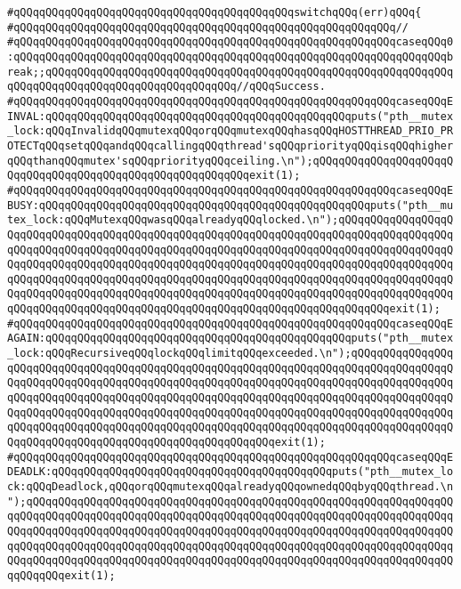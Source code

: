 \verb|#qQQqqQQqqQQqqQQqqQQqqQQqqQQqqQQqqQQqqQQqqQQqswitchqQQq(err)qQQq{|\newline
\verb|#qQQqqQQqqQQqqQQqqQQqqQQqqQQqqQQqqQQqqQQqqQQqqQQqqQQqqQQqqQQq//|\newline
\verb|#qQQqqQQqqQQqqQQqqQQqqQQqqQQqqQQqqQQqqQQqqQQqqQQqqQQqqQQqqQQqcaseqQQq0:qQQqqQQqqQQqqQQqqQQqqQQqqQQqqQQqqQQqqQQqqQQqqQQqqQQqqQQqqQQqqQQqqQQqbreak;;qQQqqQQqqQQqqQQqqQQqqQQqqQQqqQQqqQQqqQQqqQQqqQQqqQQqqQQqqQQqqQQqqQQqqQQqqQQqqQQqqQQqqQQqqQQqqQQqqQQq//qQQqSuccess.|\newline
\verb|#qQQqqQQqqQQqqQQqqQQqqQQqqQQqqQQqqQQqqQQqqQQqqQQqqQQqqQQqqQQqcaseqQQqEINVAL:qQQqqQQqqQQqqQQqqQQqqQQqqQQqqQQqqQQqqQQqqQQqqQQqputs("pth__mutex_lock:qQQqInvalidqQQqmutexqQQqorqQQqmutexqQQqhasqQQqHOSTTHREAD_PRIO_PROTECTqQQqsetqQQqandqQQqcallingqQQqthread'sqQQqpriorityqQQqisqQQqhigherqQQqthanqQQqmutex'sqQQqpriorityqQQqceiling.\n");qQQqqQQqqQQqqQQqqQQqqQQqqQQqqQQqqQQqqQQqqQQqqQQqqQQqqQQqqQQqexit(1);|\newline
\verb|#qQQqqQQqqQQqqQQqqQQqqQQqqQQqqQQqqQQqqQQqqQQqqQQqqQQqqQQqqQQqcaseqQQqEBUSY:qQQqqQQqqQQqqQQqqQQqqQQqqQQqqQQqqQQqqQQqqQQqqQQqqQQqputs("pth__mutex_lock:qQQqMutexqQQqwasqQQqalreadyqQQqlocked.\n");qQQqqQQqqQQqqQQqqQQqqQQqqQQqqQQqqQQqqQQqqQQqqQQqqQQqqQQqqQQqqQQqqQQqqQQqqQQqqQQqqQQqqQQqqQQqqQQqqQQqqQQqqQQqqQQqqQQqqQQqqQQqqQQqqQQqqQQqqQQqqQQqqQQqqQQqqQQqqQQqqQQqqQQqqQQqqQQqqQQqqQQqqQQqqQQqqQQqqQQqqQQqqQQqqQQqqQQqqQQqqQQqqQQqqQQqqQQqqQQqqQQqqQQqqQQqqQQqqQQqqQQqqQQqqQQqqQQqqQQqqQQqqQQqqQQqqQQqqQQqqQQqqQQqqQQqqQQqqQQqqQQqqQQqqQQqqQQqqQQqqQQqqQQqqQQqqQQqqQQqqQQqqQQqqQQqqQQqqQQqqQQqqQQqqQQqqQQqqQQqqQQqqQQqqQQqqQQqqQQqqQQqqQQqexit(1);|\newline
\verb|#qQQqqQQqqQQqqQQqqQQqqQQqqQQqqQQqqQQqqQQqqQQqqQQqqQQqqQQqqQQqcaseqQQqEAGAIN:qQQqqQQqqQQqqQQqqQQqqQQqqQQqqQQqqQQqqQQqqQQqqQQqputs("pth__mutex_lock:qQQqRecursiveqQQqlockqQQqlimitqQQqexceeded.\n");qQQqqQQqqQQqqQQqqQQqqQQqqQQqqQQqqQQqqQQqqQQqqQQqqQQqqQQqqQQqqQQqqQQqqQQqqQQqqQQqqQQqqQQqqQQqqQQqqQQqqQQqqQQqqQQqqQQqqQQqqQQqqQQqqQQqqQQqqQQqqQQqqQQqqQQqqQQqqQQqqQQqqQQqqQQqqQQqqQQqqQQqqQQqqQQqqQQqqQQqqQQqqQQqqQQqqQQqqQQqqQQqqQQqqQQqqQQqqQQqqQQqqQQqqQQqqQQqqQQqqQQqqQQqqQQqqQQqqQQqqQQqqQQqqQQqqQQqqQQqqQQqqQQqqQQqqQQqqQQqqQQqqQQqqQQqqQQqqQQqqQQqqQQqqQQqqQQqqQQqqQQqqQQqqQQqqQQqqQQqqQQqqQQqqQQqqQQqqQQqqQQqqQQqexit(1);|\newline
\verb|#qQQqqQQqqQQqqQQqqQQqqQQqqQQqqQQqqQQqqQQqqQQqqQQqqQQqqQQqqQQqcaseqQQqEDEADLK:qQQqqQQqqQQqqQQqqQQqqQQqqQQqqQQqqQQqqQQqqQQqputs("pth__mutex_lock:qQQqDeadlock,qQQqorqQQqmutexqQQqalreadyqQQqownedqQQqbyqQQqthread.\n");qQQqqQQqqQQqqQQqqQQqqQQqqQQqqQQqqQQqqQQqqQQqqQQqqQQqqQQqqQQqqQQqqQQqqQQqqQQqqQQqqQQqqQQqqQQqqQQqqQQqqQQqqQQqqQQqqQQqqQQqqQQqqQQqqQQqqQQqqQQqqQQqqQQqqQQqqQQqqQQqqQQqqQQqqQQqqQQqqQQqqQQqqQQqqQQqqQQqqQQqqQQqqQQqqQQqqQQqqQQqqQQqqQQqqQQqqQQqqQQqqQQqqQQqqQQqqQQqqQQqqQQqqQQqqQQqqQQqqQQqqQQqqQQqqQQqqQQqqQQqqQQqqQQqqQQqqQQqqQQqqQQqqQQqqQQqqQQqqQQqqQQqqQQqqQQqqQQqexit(1);|\newline
